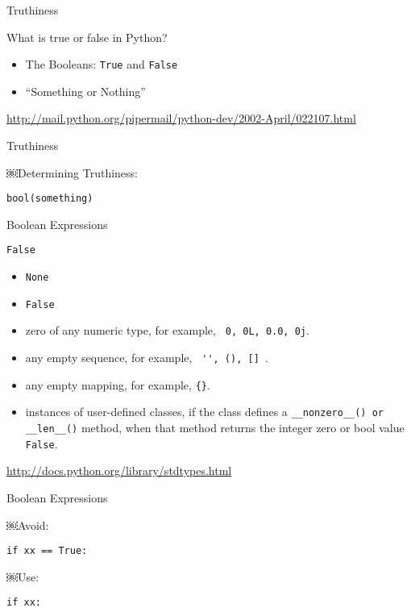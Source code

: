 \documentclass{beamer}
\begin{document}
\begin{frame}[fragile]{Truthiness}

{\Large What is true or false in Python?}

\begin{itemize}
  \item The Booleans: \verb+True+ and \verb+False+
  \item ``Something or Nothing''
\end{itemize}

{\small \url{http://mail.python.org/pipermail/python-dev/2002-April/022107.html} }

\end{frame}

\begin{frame}[fragile]{Truthiness}

{\Large ￼Determining Truthiness:}

\vfill
{\Large \verb+bool(something)+ }

\vfill


\end{frame}

\begin{frame}[fragile]{Boolean Expressions}

{\Large \verb+False+ }

\begin{itemize}
  \item \verb+None+
  \item \verb+False+
  \item zero of any numeric type, for example, \verb+ 0, 0L, 0.0, 0j+.
  \item any empty sequence, for example, \verb+ '', (), [] +.
  \item any empty mapping, for example, \verb+{}+.
  \item instances of user-defined classes, if the class defines a
        \verb+__nonzero__() or __len__()+ method, when that method
        returns the integer zero or bool value \verb+False+.
\end{itemize}

\url{http://docs.python.org/library/stdtypes.html}

\end{frame}

\begin{frame}[fragile]{Boolean Expressions}

{ \Large￼Avoid: }

\vspace{0.1in}
\verb+if xx == True:+

\vfill
{ \Large￼Use: }

\vspace{0.1in}
\verb+if xx:+

\vfill
\end{frame}
\end{document}
